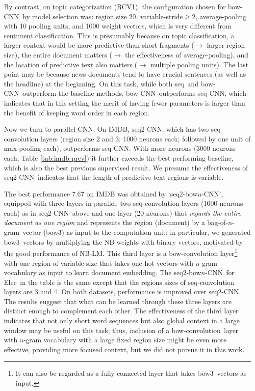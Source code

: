 \documentclass[11pt,letterpaper]{article}
\newcommand{\cnn}{CNN}
\newcommand{\scnnpfx}{seq}
\newcommand{\scnn}{seq-CNN}
\newcommand{\sscnn}{seq2-CNN}
\newcommand{\ssbcnn}{seq2-bow$n$-CNN}
\newcommand{\bcnn}{bow-CNN}
\newcommand{\bconv}{bow-convolution}
\newcommand{\bow}{{bow}}
\newcommand{\bowthree}{{bow3}}
\newcommand{\bongram}{bag-of-$n$-gram}
\newcommand{\Elec}{Elec}
\newcommand{\nbw}{NB-LM}
\begin{document}
By contrast, on topic categorization (RCV1), 
the configuration chosen for \bcnn\ by model selection was: region size 20, variable-stride$\ge$2, 
average-pooling with 10 pooling units, and 1000 weight vectors, 
which is very different from sentiment classification.  
This is presumably because 
on topic classification, a larger context would be more predictive 
than short fragments ($\rightarrow$ larger region size), 
the entire document matters ($\rightarrow$ the effectiveness of average-pooling), 
and the location of predictive text also matters ($\rightarrow$ multiple pooling units). 
The last point may be because news documents tend to have crucial sentences 
(as well as the headline) at the beginning.  
On this task, while both \scnnpfx\ and \bcnn\ outperform the baseline methods, \bcnn\ outperforms \scnn,  
which indicates that in this setting 
the merit of having fewer parameters is larger than the benefit of keeping word order 
in each region.  
 
Now we turn to parallel \cnn. %
On IMDB, \sscnn, which has two seq-convolution layers 
(region size 2 and 3; 1000 neurons each; followed by one unit of max-pooling each), 
outperforms \scnn.  With more neurons (3000 neurons each; Table \ref{tab:imdb-prev}) it 
further exceeds 
the best-performing baseline, which is also the best previous supervised result.    
We presume the effectiveness of \sscnn\ indicates that the length of predictive text regions 
is variable.  

The best performance 7.67 on IMDB was obtained by `\ssbcnn', 
equipped with three layers in parallel: 
two seq-convolution layers (1000 neurons each) as in \sscnn\ above and  
one layer (20 neurons) that {\em regards the entire document as one region} and 
represents the region (document) by a \bongram\ vector (\bowthree)
as input to the computation unit; 
in particular, we generated \bowthree\ vectors by multiplying the NB-weights with binary vectors, 
motivated by the good performance of \nbw.  
This third layer is a \bow-convolution layer\footnote{
  It can also be regarded as a fully-connected layer that takes \bowthree\ vectors as input. 
}
with one region of variable size that takes 
one-hot vectors with $n$-gram vocabulary as input to learn document embedding.  
The \ssbcnn\ for \Elec\ in the table is the same except that the regions sizes of seq-convolution layers are 
3 and 4.  On both datasets, performance is improved over \sscnn.
The results %
suggest that what can be learned through these three layers are distinct enough 
to complement each other.  
The effectiveness of the third layer indicates that not only short word sequences 
but also global context in a large window may be useful on this task; thus, inclusion of a 
\bconv\ layer with $n$-gram vocabulary with a large fixed region size might be even more effective, 
providing more focused context, 
but we did not pursue it in this work.  
\end{document}

